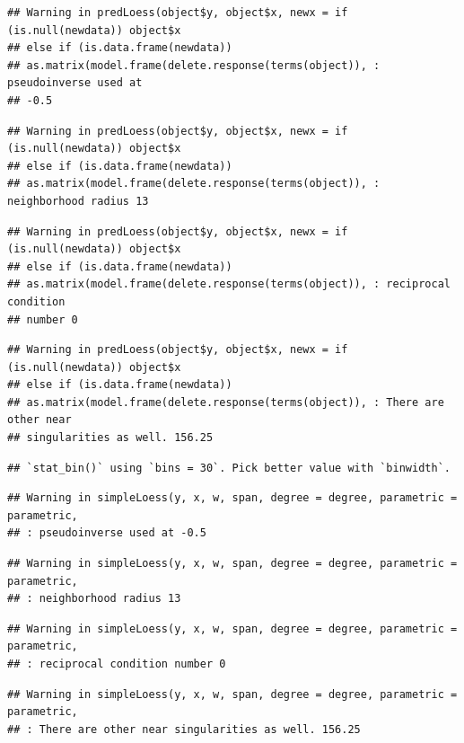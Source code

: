\documentclass[
]{article}
\begin{document}
\begin{verbatim}
## Warning in predLoess(object$y, object$x, newx = if (is.null(newdata)) object$x
## else if (is.data.frame(newdata))
## as.matrix(model.frame(delete.response(terms(object)), : pseudoinverse used at
## -0.5
\end{verbatim}

\begin{verbatim}
## Warning in predLoess(object$y, object$x, newx = if (is.null(newdata)) object$x
## else if (is.data.frame(newdata))
## as.matrix(model.frame(delete.response(terms(object)), : neighborhood radius 13
\end{verbatim}

\begin{verbatim}
## Warning in predLoess(object$y, object$x, newx = if (is.null(newdata)) object$x
## else if (is.data.frame(newdata))
## as.matrix(model.frame(delete.response(terms(object)), : reciprocal condition
## number 0
\end{verbatim}

\begin{verbatim}
## Warning in predLoess(object$y, object$x, newx = if (is.null(newdata)) object$x
## else if (is.data.frame(newdata))
## as.matrix(model.frame(delete.response(terms(object)), : There are other near
## singularities as well. 156.25
\end{verbatim}

\begin{verbatim}
## `stat_bin()` using `bins = 30`. Pick better value with `binwidth`.
\end{verbatim}

\begin{verbatim}
## Warning in simpleLoess(y, x, w, span, degree = degree, parametric = parametric,
## : pseudoinverse used at -0.5
\end{verbatim}

\begin{verbatim}
## Warning in simpleLoess(y, x, w, span, degree = degree, parametric = parametric,
## : neighborhood radius 13
\end{verbatim}

\begin{verbatim}
## Warning in simpleLoess(y, x, w, span, degree = degree, parametric = parametric,
## : reciprocal condition number 0
\end{verbatim}

\begin{verbatim}
## Warning in simpleLoess(y, x, w, span, degree = degree, parametric = parametric,
## : There are other near singularities as well. 156.25
\end{verbatim}
\end{document}
